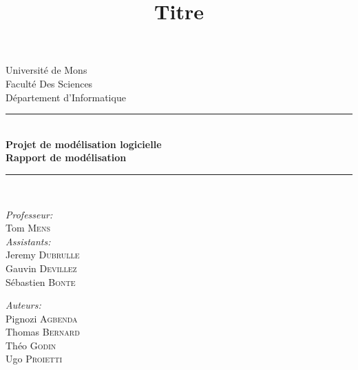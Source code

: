 \documentclass{article}
\title{Titre}
\author{ }
\date{ }
\begin{document}
\begin{titlepage}
    \begin{center}
        
        {\Large Université de Mons}\\[1ex]
        {\Large Faculté Des Sciences}\\[1ex]
        {\Large Département d'Informatique}\\[1ex]
        
        \newcommand{\HRule}{\rule{\linewidth}{0.3mm}}
        \HRule \\[0.3cm]
        { \LARGE \bfseries Projet de modélisation logicielle \\[0.3cm]}
        { \LARGE \bfseries Rapport de modélisation  \\[0.1cm]} %
        \HRule \\[1.5cm]
        
        \begin{minipage}[t]{0.45\textwidth}
            \begin{flushleft} \large
                \emph{Professeur:}\\
                Tom \textsc{Mens}\\
                \emph{Assistants:}\\
                Jeremy \textsc{Dubrulle}\\
                Gauvin \textsc{Devillez}\\
                Sébastien \textsc{Bonte}\\
            \end{flushleft}
        \end{minipage}
        \begin{minipage}[t]{0.45\textwidth}
            \begin{flushright} \large
                \emph{Auteurs:} \\
                Pignozi \textsc{Agbenda} \\
                Thomas \textsc{Bernard} \\
                Théo \textsc{Godin} \\
                Ugo \textsc{Proietti}\\
            \end{flushright}
        \end{minipage}\\[2ex]
        
        \vfill
        

\end{center}
\end{titlepage}
\end{document}
